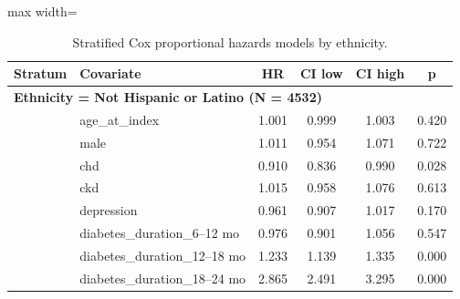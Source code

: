 \documentclass[twoside,11pt]{article}
\begin{document}
\begin{table}[H]
  \centering
  \begin{adjustbox}{max width=\textwidth}
    \begin{tabular}{llcccc}
      \hline
      \textbf{Stratum} & \textbf{Covariate}            & \textbf{HR} & \textbf{CI low} & \textbf{CI high} & \textbf{p}                  \\
      \hline

      \multicolumn{6}{l}{\textbf{Ethnicity = Not Hispanic or Latino (N = 4532)}}                                                        \\
                       & age\_at\_index                & 1.001       & 0.999           & 1.003            & 0.420                       \\
                       & male                          & 1.011       & 0.954           & 1.071            & 0.722                       \\
                       & chd                           & 0.910       & 0.836           & 0.990            & \cellcolor{lightgreen}0.028 \\
                       & ckd                           & 1.015       & 0.958           & 1.076            & 0.613                       \\
                       & depression                    & 0.961       & 0.907           & 1.017            & 0.170                       \\
                       & diabetes\_duration\_6--12 mo  & 0.976       & 0.901           & 1.056            & 0.547                       \\
                       & diabetes\_duration\_12--18 mo & 1.233       & 1.139           & 1.335            & \cellcolor{lightgreen}0.000 \\
                       & diabetes\_duration\_18--24 mo & 2.865       & 2.491           & 3.295            & \cellcolor{lightgreen}0.000 \\

      \hline
    \end{tabular}
  \end{adjustbox}
  \caption{Stratified Cox proportional hazards models by ethnicity.}
  \label{tab:ethnicity_stratified}
\end{table}


\newpage
\printbibliography
\end{document}
